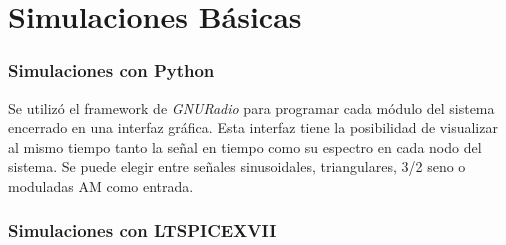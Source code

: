 


\section{Simulaciones Básicas}

\subsubsection{Simulaciones con Python}
Se utilizó el framework de \textit{GNURadio} para programar cada módulo del sistema encerrado en una interfaz gráfica. Esta interfaz tiene la posibilidad de visualizar al mismo tiempo tanto la señal en tiempo como su espectro en cada nodo del sistema. Se puede elegir entre señales sinusoidales, triangulares, 3/2 seno o moduladas AM como entrada.
\subsubsection{Simulaciones con LTSPICEXVII}

